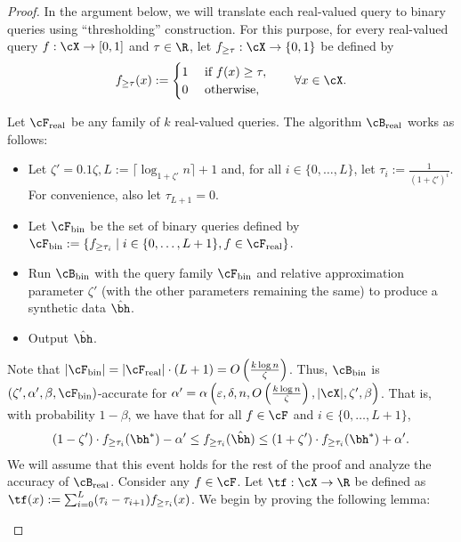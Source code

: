 \begin{proof}
In the argument below, we will translate each real-valued query to binary queries using ``thresholding'' construction. For this purpose, for every real-valued query $f: \cX \to [0, 1]$ and $\tau \in \R$, let $f_{\geq \tau}: \cX \to \{0, 1\}$ be defined by
\begin{align*}
f_{\geq \tau}(x) :=
\begin{cases}
1 & \text{ if } f(x) \geq \tau, \\
0 & \text{ otherwise,}
\end{cases}
\qquad \forall x \in \cX.
\end{align*}

Let $\cF_{\rval}$ be any family of $k$ real-valued queries. The algorithm $\cB_{\rval}$ works as follows:
\begin{itemize}
\item Let $\zeta' = 0.1\zeta, L := \lceil \log_{1+\zeta'} n \rceil + 1$ and, for all $i \in \{0, \dots, L\}$, let $\tau_i := \frac{1}{(1 + \zeta')^i}$. For convenience, also let $\tau_{L+1} = 0$.
\item Let $\cF_{\bin}$ be the set of binary queries defined by $\cF_{\bin} := \{f_{\geq \tau_i} \mid i \in \{0, \dots, L+1\}, f \in \cF_{\rval}\}$.
\item Run $\cB_{\bin}$ with the query family $\cF_{\bin}$ and relative approximation parameter $\zeta'$ (with the other parameters remaining the same) to produce a synthetic data $\hbh$.
\item Output $\hbh$.
\end{itemize}
Note that $|\cF_{\bin}| = |\cF_{\rval}| \cdot \left(L + 1\right) = O\left(\frac{k \log n}{\zeta}\right)$. Thus, $\cB_{\bin}$ is $(\zeta', \alpha', \beta, \cF_{\bin})$-accurate for $\alpha' = \alpha\left(\eps, \delta, n, O\left(\frac{k \log n}{\zeta}\right), |\cX|, \zeta', \beta\right)$. That is, with probability $1 - \beta$, we have that for all $f \in \cF$ and $i \in \{0, \ldots, L+1\}$,
\begin{align} \label{eq:acc-bin}
(1 - \zeta') \cdot f_{\geq \tau_i}(\bh^{\ast}) - \alpha' \leq  f_{\geq \tau_i}(\hbh) \leq (1 + \zeta') \cdot f_{\geq \tau_i}(\bh^{\ast}) + \alpha'.
\end{align}
We will assume that this event holds for the rest of the proof and analyze the accuracy of $\cB_{\rval}$. Consider any $f \in \cF$. Let $\tf: \cX \to \R$ be defined as $\tf(x) := \sum_{i=0}^L (\tau_i - \tau_{i + 1}) f_{\geq \tau_i}(x)$. We begin by proving the following lemma:
\begin{lemma}

\end{lemma}
\end{proof}
